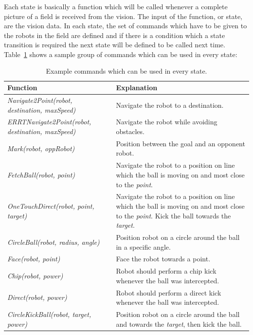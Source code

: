 \documentclass[runningheads]{llncs}
\begin{document}
Each state is basically a function which will be called whenever a complete picture of a field is received from the vision. The input of the function, or state, are the vision data.  
In each state, the set of commands which have to be given to the robots in the field are defined and if there is a condition which a state transition is required the next state will be defined to be called next time.
Table~\ref{tab1} shows a sample group of commands which can be used in every state:

\begin{table}[H]
\caption{Example commands which can be used in every state.}\label{tab1}
\begin{tabular}{|p{7.5cm}|p{6cm}|}
\hline
Function &  Explanation \\
\hline
{\itshape Navigate2Point(robot, destination, maxSpeed)} & Navigate the robot to a destination.\\
{\itshape ERRTNavigate2Point(robot, destination, maxSpeed)} & Navigate the robot while avoiding obstacles.\\
{\itshape Mark(robot, oppRobot)} & Position between the goal and an opponent robot.\\
{\itshape FetchBall(robot, point)} & Navigate the robot to a position on line which the ball is moving on and most close to the \textit{point}.\\
{\itshape OneTouchDirect(robot, point, target)} & Navigate the robot to a position on line which the ball is moving on and most close to the \textit{point}. Kick the ball towards the \textit{target}.\\
{\itshape CircleBall(robot, radius, angle)} & Position robot on a circle around the ball in a specific angle.\\
{\itshape Face(robot, point)} & Face the robot towards a point.\\
{\itshape Chip(robot, power)} & Robot should perform a chip kick whenever the ball was intercepted.\\
{\itshape Direct(robot, power)} & Robot should perform a direct kick whenever the ball was intercepted.\\
{\itshape CircleKickBall(robot, target, power)} & Position robot on a circle around the ball and towards the \textit{target}, then kick the ball.\\
\hline
\end{tabular}
\end{table}
\end{document}
